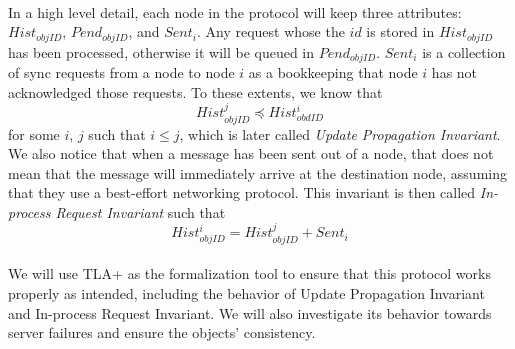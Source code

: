 \paragraph*{}
In a high level detail, each node in the protocol will keep three attributes: $Hist_{objID}$, $Pend_{objID}$, and $Sent_i$. Any request whose the $id$ is stored in $Hist_{objID}$ has been processed, otherwise it will be queued in $Pend_{objID}$. $Sent_i$ is a collection of sync requests from a node to node $i$ as a bookkeeping that node $i$ has not acknowledged those requests. To these extents, we know that
$$Hist_{objID}^j \preceq Hist_{obdID}^i$$ for some $i$, $j$ such that $i \leq j$, which is later called \textit{Update Propagation Invariant}. We also notice that when a message has been sent out of a node, that does not mean that the message will immediately arrive at the destination node, assuming that they use a best-effort networking protocol. This invariant is then called \textit{In-process Request Invariant} such that
$$Hist_{objID}^i = Hist_{objID}^j + Sent_i$$

\paragraph{}
We will use TLA+ as the formalization tool to ensure that this protocol works properly as intended, including the behavior of Update Propagation Invariant and In-process Request Invariant. We will also investigate its behavior towards server failures and ensure the objects' consistency. 


